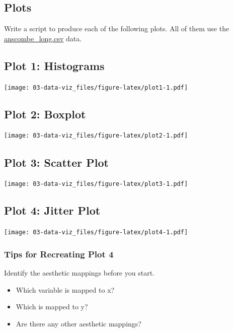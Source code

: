 \documentclass[
]{book}
\providecommand{\tightlist}{%
  \setlength{\itemsep}{0pt}\setlength{\parskip}{0pt}}
\begin{document}
\hypertarget{plots}{%
\subsection{Plots}\label{plots}}

Write a script to produce each of the following plots. All of them use the \href{assets/data/anscombe_long.csv}{anscombe\_long.csv} data.

\hypertarget{plot-1-histograms}{%
\subsection{Plot 1: Histograms}\label{plot-1-histograms}}

\texttt{[image: 03-data-viz\_files/figure-latex/plot1-1.pdf]}

\hypertarget{plot-2-boxplot}{%
\subsection{Plot 2: Boxplot}\label{plot-2-boxplot}}

\texttt{[image: 03-data-viz\_files/figure-latex/plot2-1.pdf]}

\hypertarget{plot-3-scatter-plot}{%
\subsection{Plot 3: Scatter Plot}\label{plot-3-scatter-plot}}

\texttt{[image: 03-data-viz\_files/figure-latex/plot3-1.pdf]}

\hypertarget{plot-4-jitter-plot}{%
\subsection{Plot 4: Jitter Plot}\label{plot-4-jitter-plot}}

\texttt{[image: 03-data-viz\_files/figure-latex/plot4-1.pdf]}

\hypertarget{tips-for-recreating-plot-4}{%
\subsubsection*{Tips for Recreating Plot 4}\label{tips-for-recreating-plot-4}}

Identify the aesthetic mappings before you start.

\begin{itemize}
\tightlist
\item
  Which variable is mapped to x?
\item
  Which is mapped to y?
\item
  Are there any other aesthetic mappings?
\end{itemize}
\end{document}
